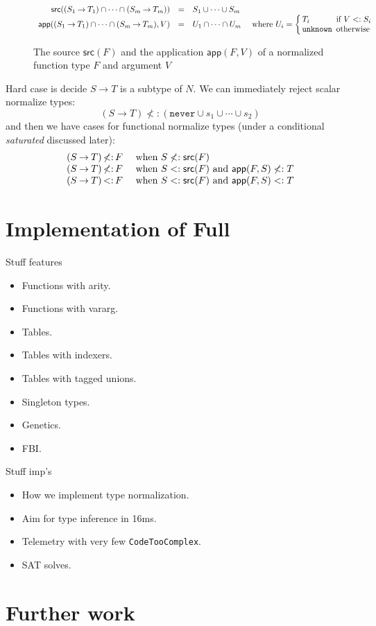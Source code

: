 \documentclass[acmsmall,review,screen]{acmart}
\newcommand{\NEVER}{\mathtt{never}}
\newcommand{\UNKNOWN}{\mathtt{unknown}}
\newcommand{\APP}{\mathsf{app}}
\newcommand{\SRC}{\mathsf{src}}
\newcommand{\fun}{\mathbin{\rightarrow}}
\begin{document}
\begin{figure}
  
\[\begin{array}{rcll}
  \SRC((S_1 \fun T_1) \cap\cdots\cap (S_m \fun T_m)) & = & S_1 \cup\cdots\cup S_m \\
  \APP((S_1 \fun T_1) \cap\cdots\cap (S_m \fun T_m), V) & = & U_1 \cap\cdots\cap U_m &
  \mbox{ where } U_i = \left\{ \begin{array}{@{\,}l@{\,}l}
    T_i & \mbox{ if } V <: S_i \\
    \UNKNOWN & \mbox{ otherwise }
  \end{array} \right.
\end{array}\]
\caption{The source $\SRC(F)$
  and the application $\APP(F, V)$ of a normalized function type $F$ and argument $V$}
\label{fig:ntypes}

\end{figure}

Hard case is decide $S \fun T$ is a subtype of $N$.
We can immediately reject scalar normalize types:
\[
  (S \fun T) \not<: (\NEVER \cup s_1 \cup\cdots\cup s_2)
\]
and then we have cases for functional normalize types (under a conditional \emph{saturated} discussed later):
\[\begin{array}{r@{\,}c@{\,}ll}
  (S \fun T) & \not<: & F & \mbox{ when } S \not<: \SRC(F) \\
  (S \fun T) & \not<: & F & \mbox{ when } S <: \SRC(F) \mbox{ and } \APP(F, S) \not<: T \\
  (S \fun T) & <: & F & \mbox{ when } S <: \SRC(F) \mbox{ and } \APP(F, S) <: T
\end{array}\]


\section{Implementation of Full }

Stuff features
\begin{itemize}
\item Functions with arity.
\item Functions with vararg.
\item Tables.
\item Tables with indexers.
\item Tables with tagged unions.
\item Singleton types.
\item Genetics.
\item FBI.
\end{itemize}
Stuff imp's
\begin{itemize}
\item How we implement type normalization.
\item Aim for type inference in 16ms.
\item Telemetry with very few \verb|CodeTooComplex|.
\item SAT solves.
\end{itemize}

\section{Further work}



\end{document}
